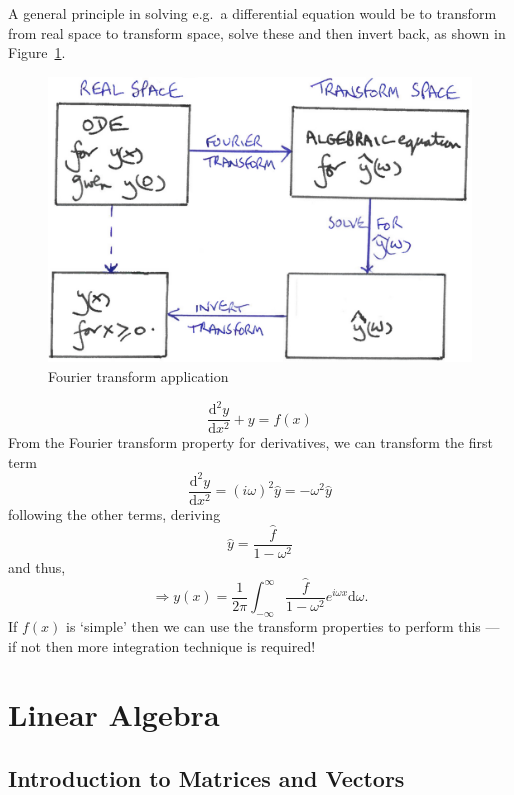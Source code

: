 \documentclass[12pt]{report}
\theoremstyle{definition}
\begin{document}
A general principle in solving e.g.\ a differential equation would be to
transform from real space to transform space, solve these and then invert back,
as shown in Figure~\ref{fig:transformApp}.

\begin{figure}
  	\includegraphics[scale=0.15]{transformApp.jpeg}
  	\centering
    \caption{Fourier transform application}\label{fig:transformApp}
\end{figure}

\begin{ex}
    \[
        \frac{\mathrm{d}^{2}y}{\mathrm{d}x^{2}}+y=f(x)
    \]
    From the Fourier transform property for derivatives, we can transform the first term\[
        \frac{\mathrm{d}^{2}y}{\mathrm{d}x^{2}} = {(i\omega)}^{2}\hat{y} = -\omega^{2}\hat{y}
    \]
    following the other terms, deriving\[
        \hat{y} = \frac{\hat{f}}{1-\omega^{2}}
    \]and thus,\[
        \Rightarrow{}y(x) = \frac{1}{2\pi}\int_{-\infty}^{\infty} \frac{\hat{f}}{1-\omega^{2}}e^{i\omega x}\mathrm{d}\omega.
    \]
    If $f(x)$ is `simple' then we can use the transform properties to perform this ---
    if not then more integration technique is required!
\end{ex} 






\chapter{Linear Algebra}

\section{Introduction to Matrices and Vectors}
\end{document}
